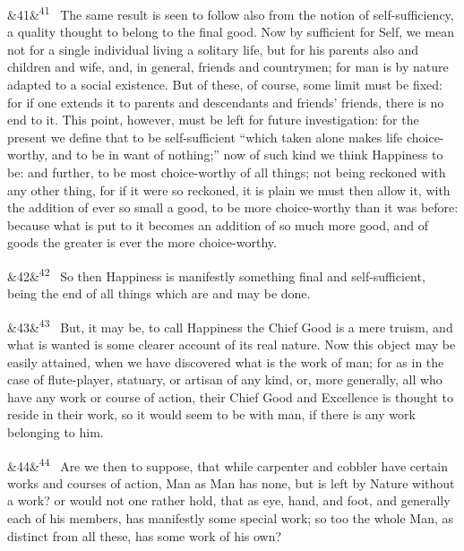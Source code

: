 \documentclass[12pt]{article}
\newcommand{\para}[1][]{\par\noindent\ifx&#1&\else\textsuperscript{\footnotesize #1}~\fi}
\begin{document}
\para[41] The same result is seen to follow also from the notion of self-sufficiency, a quality thought to belong to the final good. Now by sufficient for Self, we mean not for a single individual living a solitary life, but for his parents also and children and wife, and, in general, friends and countrymen; for man is by nature adapted to a social existence. But of these, of course, some limit must be fixed: for if one extends it to parents and descendants and friends’ friends, there is no end to it. This point, however, must be left for future investigation: for the present we define that to be self-sufficient “which taken alone makes life choice-worthy, and to be in want of nothing;” now of such kind we think Happiness to be: and further, to be most choice-worthy of all things; not being reckoned with any other thing, for if it were so reckoned, it is plain we must then allow it, with the addition of ever so small a good, to be more choice-worthy than it was before: because what is put to it becomes an addition of so much more good, and of goods the greater is ever the more choice-worthy.

\para[42] So then Happiness is manifestly something final and self-sufficient, being the end of all things which are and may be done.

\para[43] But, it may be, to call Happiness the Chief Good is a mere truism, and what is wanted is some clearer account of its real nature. Now this object may be easily attained, when we have discovered what is the work of man; for as in the case of flute-player, statuary, or artisan of any kind, or, more generally, all who have any work or course of action, their Chief Good and Excellence is thought to reside in their work, so it would seem to be with man, if there is any work belonging to him.

\para[44] Are we then to suppose, that while carpenter and cobbler have certain works and courses of action, Man as Man has none, but is left by Nature without a work? or would not one rather hold, that as eye, hand, and foot, and generally each of his members, has manifestly some special work; so too the whole Man, as distinct from all these, has some work of his own?
\end{document}
